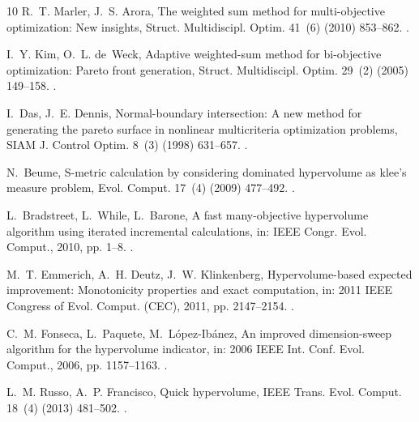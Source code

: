 \documentclass[preprint,12pt,times]{elsarticle}  %
\providecommand{\JournalTitle}[1]{#1}
\begin{document}
\begin{thebibliography}{10}
R.~T. Marler, J.~S. Arora, The weighted sum method for multi-objective
  optimization: {N}ew insights, {\JournalTitle{Struct. Multidiscipl. Optim.}}
  41~(6) (2010) 853--862.
\newblock \href {http://dx.doi.org/10.1007/s00158-009-0460-7}
  {}.

I.~Y. Kim, O.~L. de~Weck, Adaptive weighted-sum method for bi-objective
  optimization: Pareto front generation, {\JournalTitle{Struct. Multidiscipl.
  Optim.}} 29~(2) (2005) 149--158.
\newblock \href {http://dx.doi.org/10.1007/s00158-004-0465-1}
  {}.

I.~Das, J.~E. Dennis, Normal-boundary intersection: A new method for generating
  the pareto surface in nonlinear multicriteria optimization problems,
  {\JournalTitle{SIAM J. Control Optim.}} 8~(3) (1998) 631--657.
\newblock \href {http://dx.doi.org/10.1137/S1052623496307510}
  {}.

N.~Beume, S-metric calculation by considering dominated hypervolume as klee's
  measure problem, {\JournalTitle{Evol. Comput.}} 17~(4) (2009) 477--492.
\newblock \href {http://dx.doi.org/10.1162/evco.2009.17.4.17402}
  {}.

L.~Bradstreet, L.~While, L.~Barone, A fast many-objective hypervolume algorithm
  using iterated incremental calculations, in: IEEE Congr. Evol. Comput., 2010,
  pp. 1--8.
\newblock \href {http://dx.doi.org/10.1109/CEC.2010.5586344}
  {}.

M.~T. Emmerich, A.~H. Deutz, J.~W. Klinkenberg, Hypervolume-based expected
  improvement: Monotonicity properties and exact computation, in: 2011 IEEE
  Congress of Evol. Comput. (CEC), 2011, pp. 2147--2154.
\newblock \href {http://dx.doi.org/10.2514/6.2015-0143}
  {}.

C.~M. Fonseca, L.~Paquete, M.~L{\'o}pez-Ib{\'a}nez, An improved dimension-sweep
  algorithm for the hypervolume indicator, in: 2006 IEEE Int. Conf. Evol.
  Comput., 2006, pp. 1157--1163.
\newblock \href {http://dx.doi.org/10.1109/CEC.2006.1688440}
  {}.

L.~M. Russo, A.~P. Francisco, Quick hypervolume, {\JournalTitle{IEEE Trans.
  Evol. Comput.}} 18~(4) (2013) 481--502.
\newblock \href {http://dx.doi.org/10.1109/TEVC.2013.2281525}
  {}.


\end{thebibliography}
\end{document}
